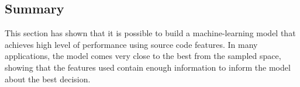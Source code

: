  \subsection{Summary}

This section has shown that it is possible to build a machine-learning model that achieves high level of performance using source code features.
In many applications, the model comes very close to the best from the sampled space, showing that the features used contain enough information to inform the model about the best decision.
